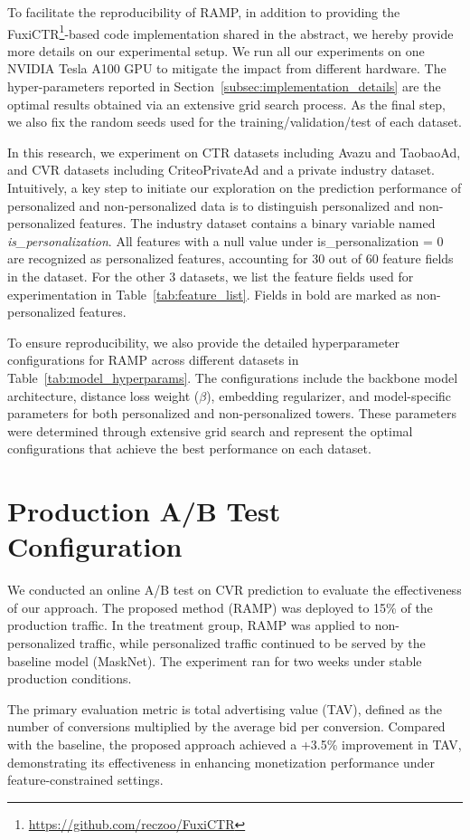 To facilitate the reproducibility of RAMP, in addition to providing the FuxiCTR\footnote{\url{https://github.com/reczoo/FuxiCTR}}-based code implementation shared in the abstract, we hereby provide more details on our experimental setup. We run all our experiments on one NVIDIA Tesla A100 GPU to mitigate the impact from different hardware. The hyper-parameters reported in Section~\ref{subsec:implementation_details} are the optimal results obtained via an extensive grid search process. As the final step, we also fix the random seeds used for the training/validation/test of each dataset.

In this research, we experiment on CTR datasets including Avazu and TaobaoAd, and CVR datasets including CriteoPrivateAd and a private industry dataset. Intuitively, a key step to initiate our exploration on the prediction performance of personalized and non-personalized data is to distinguish personalized and non-personalized features. The industry dataset contains a binary variable named \textit{is\_personalization}. All features with a null value under is\_personalization = 0 are recognized as personalized features, accounting for 30 out of 60 feature fields in the dataset. For the other 3 datasets, we list the feature fields used for experimentation in Table~\ref{tab:feature_list}. Fields in bold are marked as non-personalized features.

To ensure reproducibility, we also provide the detailed hyperparameter configurations for RAMP across different datasets in Table~\ref{tab:model_hyperparams}. The configurations include the backbone model architecture, distance loss weight ($\beta$), embedding regularizer, and model-specific parameters for both personalized and non-personalized towers. These parameters were determined through extensive grid search and represent the optimal configurations that achieve the best performance on each dataset.

\section{Production A/B Test Configuration}
\label{sec:ab_test}
We conducted an online A/B test on CVR prediction to evaluate the effectiveness of our approach. The proposed method (RAMP) was deployed to 15\% of the production traffic. In the treatment group, RAMP was applied to non-personalized traffic, while personalized traffic continued to be served by the baseline model (MaskNet). The experiment ran for two weeks under stable production conditions.

The primary evaluation metric is total advertising value (TAV), defined as the number of conversions multiplied by the average bid per conversion. Compared with the baseline, the proposed approach achieved a +3.5\% improvement in TAV, demonstrating its effectiveness in enhancing monetization performance under feature-constrained settings.
